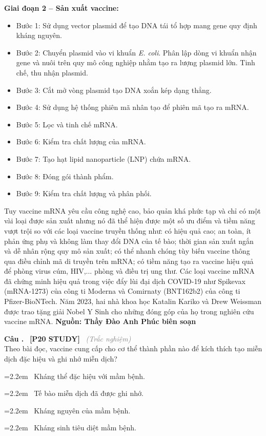 \documentclass[12pt,a4paper,twoside]{article}
\newcounter{qcounter}
\newcommand{\question}[2][]{%
    \stepcounter{qcounter}%
    \par\vspace{5pt}%
    \noindent\textcolor{primaryBlue}{\textbf{Câu \theqcounter.}}~%
    \textcolor{secondaryBlue}{\small\textbf{[P20 STUDY]}}~%
    \if\relax\detokenize{#1}\relax\else\textcolor{gray}{\small\textit{(#1)}}~\fi\\[1pt]
    \noindent #2%
}
\newcommand{\choiceitem}[2]{%
    \tikz[baseline=-0.5ex]{
        \node[draw=primaryBlue, circle, minimum size=1.5em, inner sep=0pt, thick] {\textbf{#1}};
    }~#2%
}
\newenvironment{readingpassage}[1][]{%
    \begin{tcolorbox}[enhanced, colback=grayLight, colframe=secondaryBlue,
        coltitle=textDark, fonttitle=\bfseries, title={#1},
        rounded corners, arc=3mm, boxrule=1pt,
        left=15pt, right=15pt, top=10pt, bottom=10pt,
        breakable, before skip=10pt, after skip=10pt, drop fuzzy shadow]
    \setstretch{1.3}
}{\end{tcolorbox}}
\begin{document}
\begin{readingpassage}[]
\textbf{Giai đoạn 2 -- Sản xuất vaccine:}
\begin{itemize}[leftmargin=2em, itemsep=1pt, label=--]
\item Bước 1: Sử dụng vector plasmid để tạo DNA tái tổ hợp mang gene quy định kháng nguyên.
\item Bước 2: Chuyển plasmid vào vi khuẩn \textit{E. coli}. Phân lập dòng vi khuẩn nhận gene và nuôi trên quy mô công nghiệp nhằm tạo ra lượng plasmid lớn. Tinh chế, thu nhận plasmid.
\item Bước 3: Cắt mở vòng plasmid tạo DNA xoắn kép dạng thẳng.
\item Bước 4: Sử dụng hệ thống phiên mã nhân tạo để phiên mã tạo ra mRNA.
\item Bước 5: Lọc và tinh chế mRNA.
\item Bước 6: Kiểm tra chất lượng của mRNA.
\item Bước 7: Tạo hạt lipid nanoparticle (LNP) chứa mRNA.
\item Bước 8: Đóng gói thành phẩm.
\item Bước 9: Kiểm tra chất lượng và phân phối.
\end{itemize}

Tuy vaccine mRNA yêu cầu công nghệ cao, bảo quản khá phức tạp và chỉ có một vài loại được sản xuất nhưng nó đã thể hiện được một số ưu điểm và tiềm năng vượt trội so với các loại vaccine truyền thống như: có hiệu quả cao; an toàn, ít phản ứng phụ và không làm thay đổi DNA của tế bào; thời gian sản xuất ngắn và dễ nhân rộng quy mô sản xuất; có thể nhanh chóng tùy biến vaccine thông qua điều chỉnh mã di truyền trên mRNA; có tiềm năng tạo ra vaccine hiệu quả để phòng virus cúm, HIV,... phòng và điều trị ung thư. Các loại vaccine mRNA đã chứng minh hiệu quả trong việc đẩy lùi đại dịch COVID-19 như Spikevax (mRNA-1273) của công ti Moderna và Comirnaty (BNT162b2) của công ti Pfizer-BioNTech. Năm 2023, hai nhà khoa học Katalin Kariko và Drew Weissman được trao tặng giải Nobel Y Sinh cho những đóng góp của họ trong nghiên cứu vaccine mRNA.
\hfill\textbf{Nguồn: Thầy Đào Anh Phúc biên soạn}
\end{readingpassage}
\vspace{2pt}

\question[Trắc nghiệm]{Theo bài đọc, vaccine cung cấp cho cơ thể thành phần nào để kích thích tạo miễn dịch đặc hiệu và ghi nhớ miễn dịch?}
\par\vspace{4pt}
\noindent\hangindent=2.2em\choiceitem{A}{Kháng thể đặc hiệu với mầm bệnh.}\par\vspace{4pt}
\noindent\hangindent=2.2em\choiceitem{B}{Tế bào miễn dịch đã được ghi nhớ.}\par\vspace{4pt}
\noindent\hangindent=2.2em\choiceitem{C}{Kháng nguyên của mầm bệnh.}\par\vspace{4pt}
\noindent\hangindent=2.2em\choiceitem{D}{Kháng sinh tiêu diệt mầm bệnh.}\par\vspace{4pt}
\end{document}
